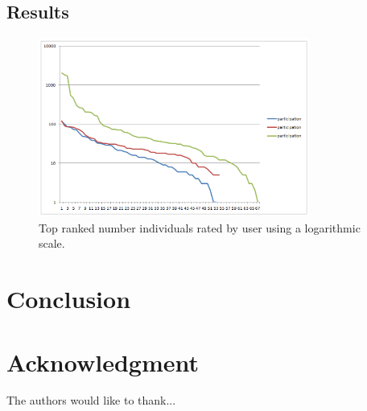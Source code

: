 \documentclass[conference]{IEEEtran}
\begin{document}


\subsection{Results}
\label{sec:results}

\begin{figure}[!t]
    \centering
        \includegraphics[width=3.5in]{img/comparison.png}
    \caption{Top ranked number individuals rated by user using a
     logarithmic scale.}
    \label{fig:top-ranked-participation}
\end{figure}


\section{Conclusion}
\label{sec:conclusions}


\section*{Acknowledgment}


The authors would like to thank...







%
%
%


\end{document}
